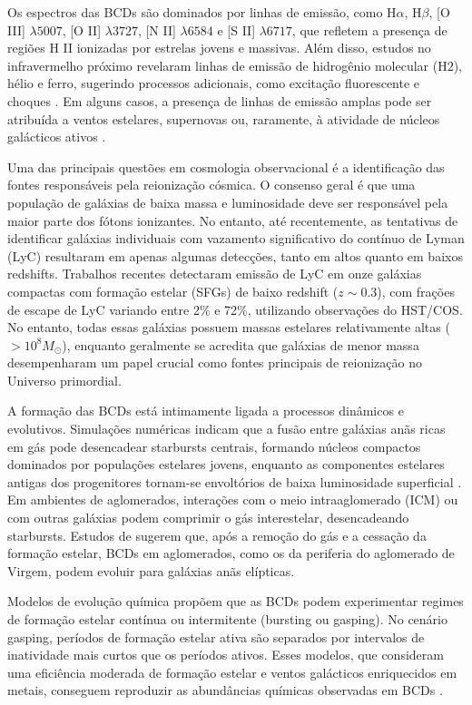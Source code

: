 Os espectros das BCDs são dominados por linhas de emissão, como H$\alpha$, H$\beta$, [O III] $\lambda 5007$, [O II] $\lambda 3727$, [N II] $\lambda 6584$ e [S II] $\lambda 6717$, que refletem a presença de regiões H II ionizadas por estrelas jovens e massivas. Além disso, estudos no infravermelho próximo revelaram linhas de emissão de hidrogênio molecular (H$2$), hélio e ferro, sugerindo processos adicionais, como excitação fluorescente e choques \citep{Izotov_2011}. Em alguns casos, a presença de linhas de emissão amplas pode ser atribuída a ventos estelares, supernovas ou, raramente, à atividade de núcleos galácticos ativos \citep{Izotov_2007}.

Uma das principais questões em cosmologia observacional é a identificação das fontes responsáveis pela reionização cósmica. O consenso geral é que uma população de galáxias de baixa massa e luminosidade deve ser responsável pela maior parte dos fótons ionizantes. No entanto, até recentemente, as tentativas de identificar galáxias individuais com vazamento significativo do contínuo de Lyman (LyC) resultaram em apenas algumas detecções, tanto em altos quanto em baixos redshifts. Trabalhos recentes \citep{Izotov_2016, Izotov_2018} detectaram emissão de LyC em onze galáxias compactas com formação estelar (SFGs) de baixo redshift ($z \sim 0.3$), com frações de escape de LyC variando entre 2\% e 72\%, utilizando observações do HST/COS. No entanto, todas essas galáxias possuem massas estelares relativamente altas ($>10^8 M_\odot$), enquanto geralmente se acredita que galáxias de menor massa desempenharam um papel crucial como fontes principais de reionização no Universo primordial.

A formação das BCDs está intimamente ligada a processos dinâmicos e evolutivos. Simulações numéricas indicam que a fusão entre galáxias anãs ricas em gás pode desencadear starbursts centrais, formando núcleos compactos dominados por populações estelares jovens, enquanto as componentes estelares antigas dos progenitores tornam-se envoltórios de baixa luminosidade superficial \citep{Bekki_2008}. Em ambientes de aglomerados, interações com o meio intraaglomerado (ICM) ou com outras galáxias podem comprimir o gás interestelar, desencadeando starbursts. Estudos de \citep{Watts_2016} sugerem que, após a remoção do gás e a cessação da formação estelar, BCDs em aglomerados, como os da periferia do aglomerado de Virgem, podem evoluir para galáxias anãs elípticas.

Modelos de evolução química propõem que as BCDs podem experimentar regimes de formação estelar contínua ou intermitente (bursting ou gasping). No cenário gasping, períodos de formação estelar ativa são separados por intervalos de inatividade mais curtos que os períodos ativos. Esses modelos, que consideram uma eficiência moderada de formação estelar e ventos galácticos enriquecidos em metais, conseguem reproduzir as abundâncias químicas observadas em BCDs \citep{Yin_2011}.

